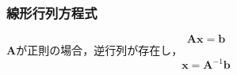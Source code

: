 \subsubsection{線形行列方程式}$$
\mathbf{A}\mathbf{x}=\mathbf{b}
$$
$\mathbf{A}$が正則の場合，逆行列が存在し，
$$
\mathbf{x}=\mathbf{A}^{-1}\mathbf{b}
$$